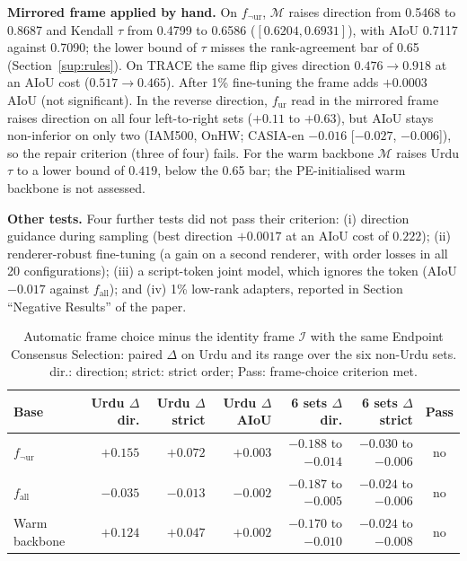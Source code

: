 \documentclass[10pt,a4paper]{article}
\newcommand{\botrule}{\bottomrule}
\newcommand{\fur}{f_{\mathrm{ur}}}
\newcommand{\fall}{f_{\mathrm{all}}}
\newcommand{\fnot}[1]{f_{\neg\mathrm{#1}}}
\newcommand{\Fi}{\mathcal{I}}
\newcommand{\Fm}{\mathcal{M}}
\begin{document}
\textbf{Mirrored frame applied by hand.} On $\fnot{ur}$, $\Fm$ raises direction from 0.5468 to 0.8687 and Kendall $\tau$ from 0.4799 to 0.6586 ($[0.6204, 0.6931]$), with AIoU 0.7117 against 0.7090; the lower bound of $\tau$ misses the rank-agreement bar of 0.65 (Section~\ref{sup:rules}). On TRACE the same flip gives direction $0.476\to0.918$ at an AIoU cost ($0.517\to0.465$). After 1\% fine-tuning the frame adds $+0.0003$ AIoU (not significant). In the reverse direction, $\fur$ read in the mirrored frame raises direction on all four left-to-right sets ($+0.11$ to $+0.63$), but AIoU stays non-inferior on only two (IAM500, OnHW; CASIA-en $-0.016$ [$-0.027$, $-0.006$]), so the repair criterion (three of four) fails. For the warm backbone $\Fm$ raises Urdu $\tau$ to a lower bound of $0.419$, below the 0.65 bar; the PE-initialised warm backbone is not assessed.

\textbf{Other tests.} Four further tests did not pass their criterion: (i) direction guidance during sampling (best direction $+0.0017$ at an AIoU cost of $0.222$); (ii) renderer-robust fine-tuning (a gain on a second renderer, with order losses in all 20 configurations); (iii) a script-token joint model, which ignores the token (AIoU $-0.017$ against $\fall$); and (iv) 1\% low-rank adapters, reported in Section ``Negative Results'' of the paper.

\begin{table}[!htbp]
\centering
\caption{Automatic frame choice minus the identity frame $\Fi$ with the same Endpoint Consensus Selection: paired $\Delta$ on Urdu and its range over the six non-Urdu sets. dir.: direction; strict: strict order; Pass: frame-choice criterion met.}\label{tabS:r1d}
\scriptsize\setlength{\tabcolsep}{3pt}
\begin{tabular}{@{}lrrrrrc@{}}
\toprule
Base & Urdu $\Delta$dir. & Urdu $\Delta$strict & Urdu $\Delta$AIoU & 6 sets $\Delta$dir. & 6 sets $\Delta$strict & Pass\\
\midrule
$\fnot{ur}$ & $+0.155$ & $+0.072$ & $+0.003$ & $-0.188$ to $-0.014$ & $-0.030$ to $-0.006$ & no\\
$\fall$ & $-0.035$ & $-0.013$ & $-0.002$ & $-0.187$ to $-0.005$ & $-0.024$ to $-0.006$ & no\\
Warm backbone & $+0.124$ & $+0.047$ & $+0.002$ & $-0.170$ to $-0.010$ & $-0.024$ to $-0.008$ & no\\
\botrule
\end{tabular}
\end{table}
\FloatBarrier
\end{document}
